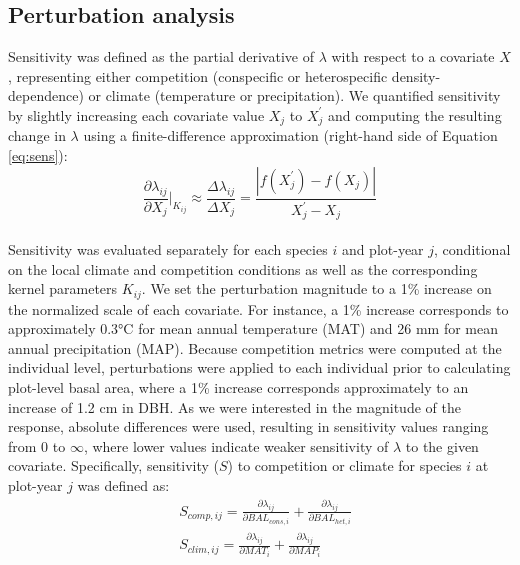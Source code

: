 \hypertarget{perturbation-analysis}{%
\subsection{Perturbation analysis}\label{perturbation-analysis}}

Sensitivity was defined as the partial derivative of \(\lambda\) with
respect to a covariate \(X\), representing either competition
(conspecific or heterospecific density-dependence) or climate
(temperature or precipitation). We quantified sensitivity by slightly
increasing each covariate value \(X_j\) to \(X_j^{'}\) and computing the
resulting change in \(\lambda\) using a finite-difference approximation
(right-hand side of Equation \ref{eq:sens}):\\

\begin{equation}
\frac{\partial \lambda_{ij}}{\partial X_j} \bigg\rvert_{K_{ij}} \approx \frac{\Delta \lambda_{ij}}{\Delta X_j} = \frac{|f(X_j^{'}) - f(X_j)|}{X_j^{'} - X_j}
\label{eq:sens}\end{equation}\\

Sensitivity was evaluated separately for each species \(i\) and
plot-year \(j\), conditional on the local climate and competition
conditions as well as the corresponding kernel parameters \(K_{ij}\). We
set the perturbation magnitude to a 1\% increase on the normalized scale
of each covariate. For instance, a 1\% increase corresponds to
approximately 0.3°C for mean annual temperature (MAT) and 26 mm for mean
annual precipitation (MAP). Because competition metrics were computed at
the individual level, perturbations were applied to each individual
prior to calculating plot-level basal area, where a 1\% increase
corresponds approximately to an increase of 1.2 cm in DBH. As we were
interested in the magnitude of the response, absolute differences were
used, resulting in sensitivity values ranging from 0 to \(\infty\),
where lower values indicate weaker sensitivity of \(\lambda\) to the
given covariate. Specifically, sensitivity (\(S\)) to competition or
climate for species \(i\) at plot-year \(j\) was defined as:\\

\begin{equation}
\begin{split}
&S_{comp, ij} = \frac{\partial \lambda_{ij}}{\partial BAL_{cons, i}} + \frac{\partial \lambda_{ij}}{\partial BAL_{het, i}} \\[2pt]
&S_{clim, ij} = \frac{\partial \lambda_{ij}}{\partial MAT_{i}} + \frac{\partial \lambda_{ij}}{\partial MAP_{i}} \\[2pt]
\end{split}
\label{eq:CCR}\end{equation}\\

